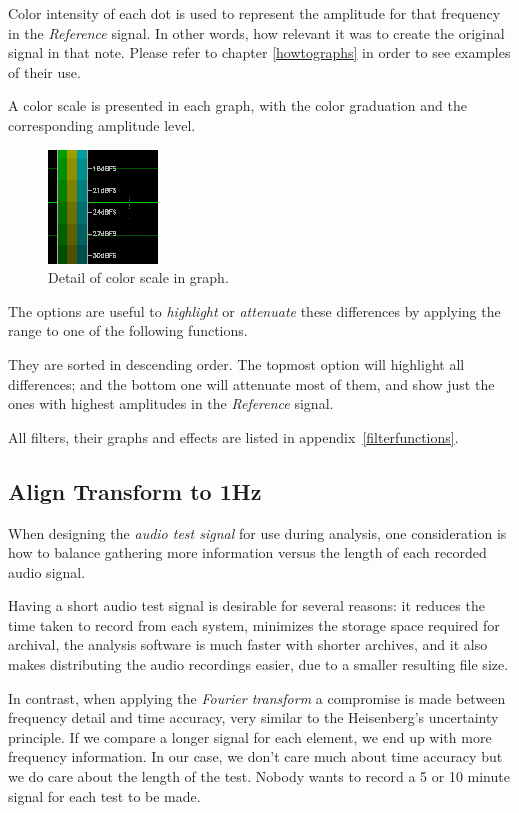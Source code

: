 \documentclass[10pt,a4paper]{report}
\begin{document}
\begin{appendices}
Color intensity of each dot is used to represent the amplitude for that frequency in the \textit{Reference} signal. In other words, how relevant it was to create the original signal in that note. Please refer to chapter \ref{howtographs} in order to see examples of their use.

A color scale is presented in each graph, with the color graduation and the corresponding amplitude level.

\begin{figure}[H]
	\centering
	\includegraphics[width=0.2\linewidth]{images/colorfilter/colorscale.png}
	\caption[Graph color scale]{Detail of color scale in graph.}
	\label{fig:colorscale}
\end{figure}

The options are useful to \textit{highlight} or \textit{attenuate} these differences by applying the range to one of the following functions. 

They are sorted in descending order. The topmost option will highlight all differences; and the bottom one will attenuate most of them, and show just the ones with highest amplitudes in the \textit{Reference} signal.

All filters, their graphs and effects are listed in appendix~\ref{filterfunctions}.

\subsection{Align Transform to 1Hz}

When designing the \textit{audio test signal} for use during analysis, one consideration is how to balance gathering more information versus the length of each recorded audio signal. 

Having a short audio test signal is desirable for several reasons: it reduces the time taken to record from each system, minimizes the storage space required for archival, the analysis software is much faster with shorter archives, and it also makes distributing the audio recordings easier, due to a smaller resulting file size.

In contrast, when applying the \textit{Fourier transform} a compromise is made between frequency detail and time accuracy, very similar to the Heisenberg's uncertainty principle. If we compare a longer signal for each element, we end up with more frequency information. In our case, we don't care much about time accuracy but we do care about the length of the test. Nobody wants to record a 5 or 10 minute signal for each test to be made.


\end{appendices}
\end{document}
